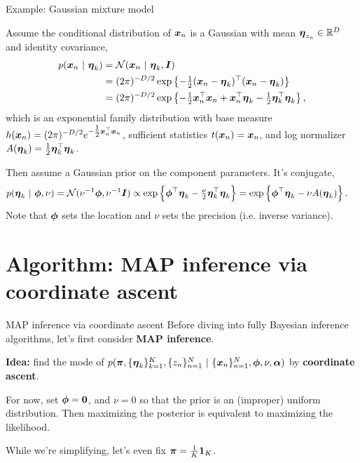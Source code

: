 \documentclass[aspectratio=169]{beamer}
\begin{document}
\begin{frame}{Example: Gaussian mixture model}

Assume the conditional distribution of $\boldsymbol{x}_n$ is a Gaussian with mean $\boldsymbol{\eta}_{z_n} \in \mathbb{R}^D$ and identity covariance,
\begin{align}
    p(\boldsymbol{x}_n ~\vert~ \boldsymbol{\eta}_k) &= \mathcal{N}(\boldsymbol{x}_n ~\vert~ \boldsymbol{\eta}_{k}, \boldsymbol{I}) \\
    &= (2\pi)^{-D/2} \exp \left \{-\tfrac{1}{2} (\boldsymbol{x}_n - \boldsymbol{\eta}_k)^\top (\boldsymbol{x}_n - \boldsymbol{\eta}_k) \right\} \\
    &= (2\pi)^{-D/2} \exp \left \{-\tfrac{1}{2} \boldsymbol{x}_n^\top \boldsymbol{x}_n + \boldsymbol{x}_n^\top \boldsymbol{\eta}_k - \tfrac{1}{2} \boldsymbol{\eta}_k^\top \boldsymbol{\eta}_k \right\},
\end{align}
which is an exponential family distribution with base measure $h(\boldsymbol{x}_n) = (2\pi)^{-D/2} e^{-\tfrac{1}{2}\boldsymbol{x}_n^\top \boldsymbol{x}_n}$, sufficient statistics $t(\boldsymbol{x}_n) = \boldsymbol{x}_n$, and log normalizer $A(\boldsymbol{\eta}_k) = \tfrac{1}{2} \boldsymbol{\eta}_k^\top \boldsymbol{\eta}_k$.

Then assume a Gaussian prior on the component parameters. It's conjugate,
\begin{align}
    p(\boldsymbol{\eta}_k ~\vert~ \boldsymbol{\phi}, \nu) &= \mathcal{N}(\nu^{-1} \boldsymbol{\phi}, \nu^{-1} \boldsymbol{I}) 
    \propto \exp \left\{\boldsymbol{\phi}^\top \boldsymbol{\eta}_k -\tfrac{\nu}{2} \boldsymbol{\eta}_k^\top \boldsymbol{\eta}_k \right\}
    = \exp \left\{\boldsymbol{\phi}^\top \boldsymbol{\eta}_k -\nu A(\boldsymbol{\eta}_k) \right\}.
\end{align}
Note that $\boldsymbol{\phi}$ sets the location and $\nu$ sets the precision (i.e. inverse variance). 
    
\end{frame}

\section{Algorithm: MAP inference via coordinate ascent}
\label{sec:map_inference}

\begin{frame}{MAP inference via coordinate ascent}
Before diving into fully Bayesian inference algorithms, let's first consider \textbf{MAP inference}. 

\textbf{Idea: } find the mode of $p(\boldsymbol{\pi}, \{\boldsymbol{\eta}_k\}_{k=1}^K, \{z_n\}_{n=1}^N ~\vert~ \{\boldsymbol{x}_n\}_{n=1}^N, \boldsymbol{\phi}, \nu, \boldsymbol{\alpha})$ by \textbf{coordinate ascent}.

For now, set $\boldsymbol{\phi}= \boldsymbol{0}$, and $\nu=0$ so that the prior is an (improper) uniform distribution. Then maximizing the posterior is equivalent to maximizing the likelihood. 

While we're simplifying, let's even fix $\boldsymbol{\pi} = \tfrac{1}{K} \boldsymbol{1}_K$.

\end{frame}
\end{document}
